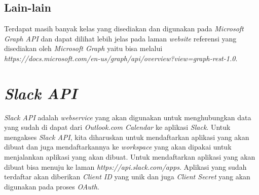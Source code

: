 \subsection{Lain-lain}
Terdapat masih banyak kelas yang disediakan dan digunakan pada \textit{Microsoft Graph API} dan dapat dilihat lebih jelas pada laman \textit{website} referensi yang disediakan oleh \textit{Microsoft Graph} yaitu bisa melalui \textit{https://docs.microsoft.com/en-us/graph/api/overview?view=graph-rest-1.0}. 

\section{\textit{Slack API}}
\label{sec:slack}
\textit{Slack API} adalah \textit{webservice} yang akan digunakan untuk menghubungkan data yang sudah di dapat dari \textit{Outlook.com Calendar} ke aplikasi \textit{Slack}. Untuk mengakses \textit{Slack API}, kita diharuskan untuk mendaftarkan aplikasi yang akan dibuat dan juga mendaftarkannya ke \textit{workspace} yang akan dipakai untuk menjalankan aplikasi yang akan dibuat. Untuk mendaftarkan aplikasi yang akan dibuat bisa menuju ke laman \textit{https://api.slack.com/apps}. Aplikasi yang sudah terdaftar akan diberikan \textit{Client ID} yang unik dan juga \textit{Client Secret} yang akan digunakan pada proses \textit{OAuth}. 

